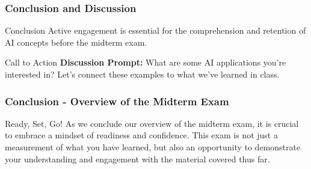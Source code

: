 \documentclass[aspectratio=169]{beamer}
\begin{document}
\begin{frame}[fragile]
    \frametitle{Conclusion and Discussion}
    \begin{block}{Conclusion}
        Active engagement is essential for the comprehension and retention of AI concepts before the midterm exam.
    \end{block}
    \begin{block}{Call to Action}
        \textbf{Discussion Prompt:} What are some AI applications you're interested in? Let’s connect these examples to what we've learned in class.
    \end{block}
\end{frame}

\begin{frame}[fragile]
    \frametitle{Conclusion - Overview of the Midterm Exam}
    \begin{block}{Ready, Set, Go!}
        As we conclude our overview of the midterm exam, it is crucial to embrace a mindset of readiness and confidence. This exam is not just a measurement of what you have learned, but also an opportunity to demonstrate your understanding and engagement with the material covered thus far.
    \end{block}
\end{frame}
\end{document}
